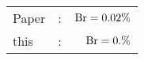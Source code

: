      \begin{tabular}{lcr}
          Paper &:& $\mathrm{Br}  = 0.02\%$ \\
          this      &:& $\mathrm{Br}  = 0.\%$ \\        
      \end{tabular}
